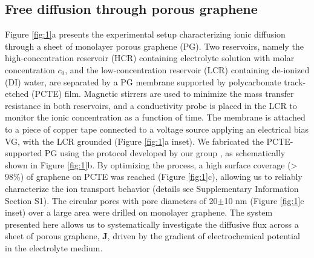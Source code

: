 \documentclass[manuscript=letter, email=true, hyperref=true, keywords=false]{achemso}
\begin{document}
\subsection{Free diffusion through porous graphene}
\label{sec:res-1}

Figure \ref{fig:1}a presents the experimental setup characterizing
ionic diffusion through a sheet of monolayer porous graphene (PG). Two
reservoirs, namely the high-concentration reservoir (HCR) containing
electrolyte solution with molar concentration $c_0$, and the
low-concentration reservoir (LCR) containing de-ionized (DI) water,
are separated by a PG membrane supported by polycarbonate track-etched
(PCTE) film. Magnetic stirrers are used to minimize the mass transfer
resistance in both reservoirs, and a conductivity probe is placed in
the LCR to monitor the ionic concentration as a function of time. The
membrane is attached to a piece of copper tape connected to a voltage
source applying an electrical bias VG, with the LCR grounded (Figure
\ref{fig:1}a inset). We fabricated the PCTE-supported PG using the
protocol developed by our group , as schematically shown in
Figure \ref{fig:1}b. By optimizing the process, a high surface
coverage (> 98\%) of graphene on PCTE was reached (Figure
\ref{fig:1}c), allowing us to reliably characterize the ion transport
behavior (details see Supplementary Information Section S1). The
circular pores with pore diameters of 20$\pm$10 nm (Figure
\ref{fig:1}c inset) over a large area were drilled on monolayer
graphene. The system presented here allows us to systematically
investigate the diffusive flux across a sheet of porous graphene,
$\boldsymbol{J}$, driven by the gradient of electrochemical potential in
the electrolyte medium.
\end{document}
